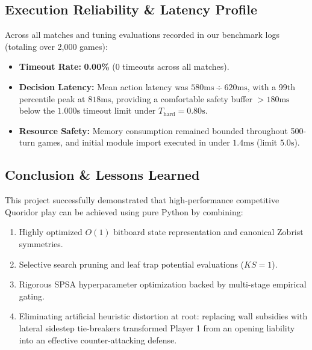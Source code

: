 \subsection{Execution Reliability \& Latency Profile}
Across all matches and tuning evaluations recorded in our benchmark logs (totaling over 2,000 games):
\begin{itemize}[leftmargin=1.5em]
    \item \textbf{Timeout Rate:} \textbf{0.00\%} ($0$ timeouts across all matches).
    \item \textbf{Decision Latency:} Mean action latency was $580\text{ms} \div 620\text{ms}$, with a 99th percentile peak at $818\text{ms}$, providing a comfortable safety buffer $> 180\text{ms}$ below the $1.000\text{s}$ timeout limit under $T_{\text{hard}} = 0.80\text{s}$.
    \item \textbf{Resource Safety:} Memory consumption remained bounded throughout 500-turn games, and initial module import executed in under $1.4\text{ms}$ (limit $5.0\text{s}$).
\end{itemize}

\subsection{Conclusion \& Lessons Learned}
This project successfully demonstrated that high-performance competitive Quoridor play can be achieved using pure Python by combining:
\begin{enumerate}[leftmargin=1.5em]
    \item Highly optimized $O(1)$ bitboard state representation and canonical Zobrist symmetries.
    \item Selective search pruning and leaf trap potential evaluations ($KS = 1$).
    \item Rigorous SPSA hyperparameter optimization backed by multi-stage empirical gating.
    \item Eliminating artificial heuristic distortion at root: replacing wall subsidies with lateral sidestep tie-breakers transformed Player 1 from an opening liability into an effective counter-attacking defense.
\end{enumerate}

